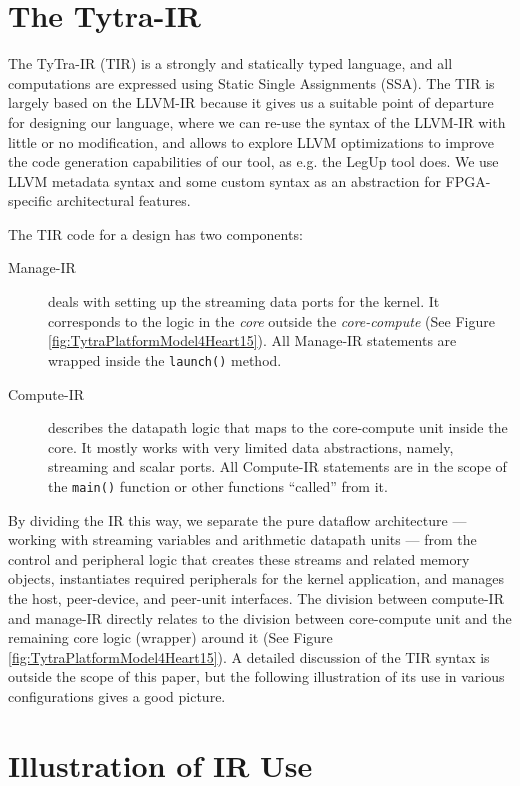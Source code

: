 \documentclass[]{heart2015_WN4Pre}
\begin{document}
\section{The Tytra-IR}
\label{sec:TIR}

The TyTra-IR (TIR) is a strongly and statically typed language, and all computations are expressed using Static Single Assignments (SSA). The TIR is largely based on the LLVM-IR because it gives us a suitable point of departure for designing our language, where we can re-use the syntax of the LLVM-IR with little or no modification, and allows to explore LLVM optimizations to improve the code generation capabilities of our tool, as e.g. the LegUp \cite{112.153} tool does. We use LLVM metadata syntax and some custom syntax as an abstraction for FPGA-specific architectural features. 


The TIR code for a design has two components:
\begin{description}
	\item [{Manage-IR}] deals with setting	up the streaming data ports for the kernel. It corresponds to the logic in the \textit{core} outside the \textit{core-compute} (See Figure \ref{fig:TytraPlatformModel4Heart15}). All Manage-IR statements are wrapped inside the \texttt{launch()} method.
	
	\item [{Compute-IR}] describes the datapath logic that maps to the core-compute unit inside the core. It mostly works with very limited data abstractions, namely, streaming and scalar ports. All Compute-IR statements are in the scope of the \texttt{main()} function or other functions ``called'' from it.
\end{description}

By dividing the IR this way, we separate the pure dataflow architecture --- working with streaming variables and arithmetic datapath units ---  from the control and peripheral logic that creates these streams and related memory objects, instantiates required peripherals for the kernel application, and manages the host, peer-device, and peer-unit interfaces. The division between compute-IR and manage-IR directly relates to the division between core-compute unit and the remaining core logic (wrapper) around it (See Figure \ref{fig:TytraPlatformModel4Heart15}). A detailed discussion of the TIR syntax is outside the scope of this paper, but the following illustration of its use in various configurations gives a good picture.

\section{Illustration of IR Use}
\label{sec:TIR-illustration}
\end{document}
